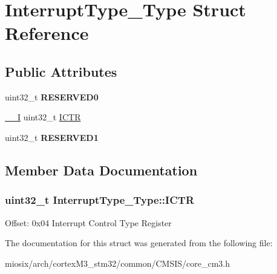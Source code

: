 \hypertarget{struct_interrupt_type___type}{\section{Interrupt\-Type\-\_\-\-Type Struct Reference}
\label{struct_interrupt_type___type}
}
\subsection*{Public Attributes}
\begin{DoxyCompactItemize}
\item 
\hypertarget{struct_interrupt_type___type_ae0d588643b0488fce4c0a90b85edf362}{uint32\-\_\-t {\bfseries R\-E\-S\-E\-R\-V\-E\-D0}}\label{struct_interrupt_type___type_ae0d588643b0488fce4c0a90b85edf362}

\item 
\hyperlink{group___c_m_s_i_s__core__definitions_gaf63697ed9952cc71e1225efe205f6cd3}{\-\_\-\-\_\-\-I} uint32\-\_\-t \hyperlink{struct_interrupt_type___type_a2b10f6d37363a6b798ac97f4c4db1e63}{I\-C\-T\-R}
\item 
\hypertarget{struct_interrupt_type___type_a45933eb981309d50f943ec3af67f17be}{uint32\-\_\-t {\bfseries R\-E\-S\-E\-R\-V\-E\-D1}}\label{struct_interrupt_type___type_a45933eb981309d50f943ec3af67f17be}

\end{DoxyCompactItemize}


\subsection{Member Data Documentation}
\hypertarget{struct_interrupt_type___type_a2b10f6d37363a6b798ac97f4c4db1e63}{
\subsubsection[{I\-C\-T\-R}]{ uint32\-\_\-t Interrupt\-Type\-\_\-\-Type\-::\-I\-C\-T\-R}}\label{struct_interrupt_type___type_a2b10f6d37363a6b798ac97f4c4db1e63}
Offset\-: 0x04 Interrupt Control Type Register 

The documentation for this struct was generated from the following file\-:\begin{DoxyCompactItemize}
\item 
miosix/arch/cortex\-M3\-\_\-stm32/common/\-C\-M\-S\-I\-S/core\-\_\-cm3.\-h\end{DoxyCompactItemize}
